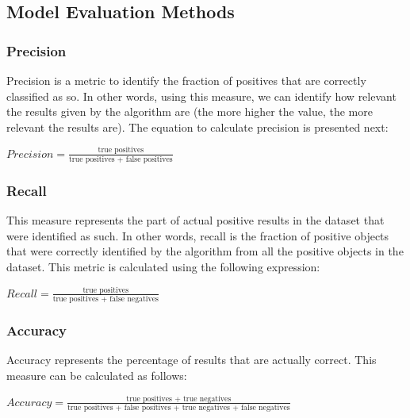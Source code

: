 \subsection{Model Evaluation Methods}

\subsubsection{Precision}

Precision is a metric to identify the fraction of positives that are correctly
classified as so. In other words, using this measure, we can identify how
relevant the results given by the algorithm are (the more higher the value, the
more relevant the results are). The equation to calculate precision is presented
next:

\begin{center} \Large \begin{math} Precision = \frac{\text{true
positives}}{\text{true positives + false positives}} \end{math} \normalsize
\end{center}


\subsubsection{Recall}

This measure represents the part of actual positive results in the dataset that
were identified as such. In other words, recall is the fraction of positive
objects that were correctly identified by the algorithm from all the positive
objects in the dataset. This metric is calculated using the following
expression:

\begin{center} \Large \begin{math} Recall = \frac{\text{true
positives}}{\text{true positives + false negatives}} \end{math} \normalsize
\end{center}

\subsubsection{Accuracy}

Accuracy represents the percentage of results that are actually correct. This
measure can be calculated as follows:

\begin{center} \Large \begin{math} Accuracy = \frac{\text{true positives + true
negatives}}{\text{true positives + false positives + true negatives + false
negatives}} \end{math} \normalsize \end{center}


